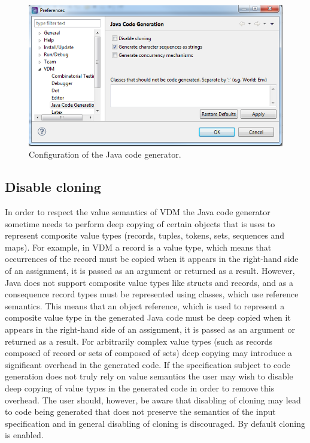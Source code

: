 \documentclass{overturerepchap}
\begin{document}
\begin{figure}[htbp]
\begin{center}
\includegraphics[width=13cm]{screenDumps/javacg_config}
\caption{Configuration of the Java code generator.\label{fig:javacg_config}}
\end{center}
\end{figure}

\subsection{Disable cloning}

In order to respect the value semantics of VDM the Java code generator sometime needs to perform deep copying of certain objects that is uses to represent composite value types (records, tuples, tokens, sets, sequences and maps). For example, in VDM a record is a value type, which means that occurrences of the record must be copied when it appears in the right-hand side of an assignment, it is passed as an argument or returned as a result. However, Java does not support composite value types like structs and records, and as a consequence record types must be represented using classes, which use reference semantics. This means that an object reference, which is used to represent a composite value type in the generated Java code must be deep copied when it appears in the right-hand side of an assignment, it is passed as an argument or returned as a result. For arbitrarily complex value types (such as records composed of record or sets of composed of sets) deep copying may introduce a significant overhead in the generated code. If the specification subject to code generation does not truly rely on value semantics the user may wish to disable deep copying of value types in the generated code in order to remove this overhead. The user should, however, be aware that disabling of cloning may lead to code being generated that does not preserve the semantics of the input specification and in general disabling of cloning is discouraged. By default cloning is enabled.
\end{document}
